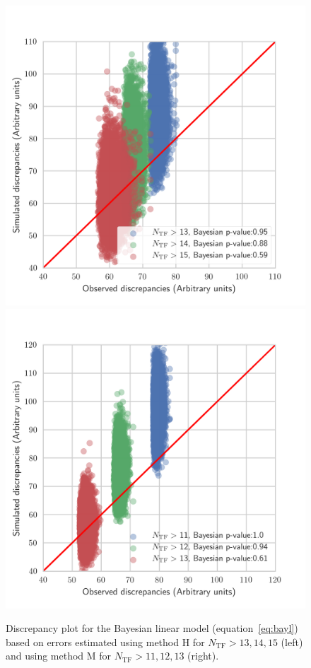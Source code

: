 \documentclass[a4paper,fleqn,usenatbib]{mnras}
\begin{document}
\begin{figure}
	\includegraphics[scale=0.69]{discl.png}
	\includegraphics[scale=0.69]{discl2.png}
    \caption{Discrepancy plot for the Bayesian linear model (equation~\ref{eq:bayl}) based on errors estimated using method H for $N_\mathrm{TF}>13,14,15$ (left) and using method M for $N_\mathrm{TF}>11,12,13$ (right). }
    \label{fig:discl}
\end{figure}
\end{document}
